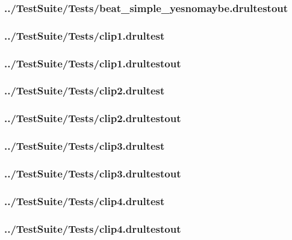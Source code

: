 \begin{changemargin}{-1in}{-1in}
\subsubsection{../TestSuite/Tests/beat\_simple\_yesnomaybe.drultestout}


\subsubsection{../TestSuite/Tests/clip1.drultest}


\subsubsection{../TestSuite/Tests/clip1.drultestout}


\subsubsection{../TestSuite/Tests/clip2.drultest}


\subsubsection{../TestSuite/Tests/clip2.drultestout}


\subsubsection{../TestSuite/Tests/clip3.drultest}


\subsubsection{../TestSuite/Tests/clip3.drultestout}


\subsubsection{../TestSuite/Tests/clip4.drultest}


\subsubsection{../TestSuite/Tests/clip4.drultestout}



\end{changemargin}
